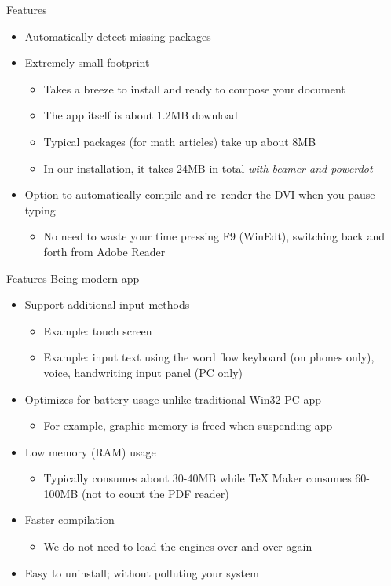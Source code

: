 \documentclass{beamer}
\begin{document}
\begin{frame}{Features}
\begin{itemize}
\item Automatically detect missing packages
\item Extremely small footprint
\begin{itemize}
\item Takes a breeze to install and ready to compose your document
\item The app itself is about 1.2MB download
\item Typical packages (for math articles) take up about 8MB
\item In our installation, it takes 24MB in total \emph{with beamer and powerdot}
\end{itemize}
\item Option to automatically compile and re--render the DVI when you pause typing
\begin{itemize}
\item No need to waste your time pressing F9 (WinEdt), switching back and forth from Adobe Reader
\end{itemize}
\end{itemize}
\end{frame}

\begin{frame}{Features}
Being modern app
\begin{itemize}
\item Support additional input methods
\begin{itemize}
\item Example: touch screen
\item Example: input text using the word flow keyboard (on phones only), voice, handwriting input panel (PC only)
\end{itemize}
\item Optimizes for battery usage unlike traditional Win32 PC app
\begin{itemize}
\item For example, graphic memory is freed when suspending app
\end{itemize}
\item Low memory (RAM) usage
\begin{itemize}
\item Typically consumes about 30-40MB while TeX Maker consumes 60-100MB (not to count the PDF reader)
\end{itemize}
\item Faster compilation
\begin{itemize}
\item We do not need to load the engines over and over again
\end{itemize}
\item Easy to uninstall; without polluting your system
\end{itemize}
\end{frame}
\end{document}
